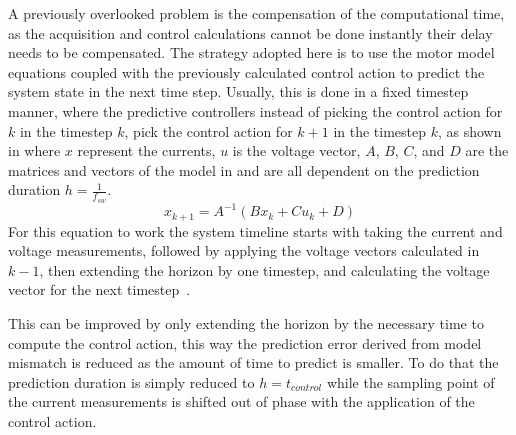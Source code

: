 \documentclass[9pt,conference]{IEEEtran}
\begin{document}
A previously overlooked problem is the compensation of the computational time, as the acquisition and control calculations cannot be done instantly their delay needs to be compensated. The strategy adopted here is to use the motor model equations  coupled with the previously calculated control action to predict the system state in the next time step. Usually, this is done in a fixed timestep manner, where the predictive controllers instead of picking the control action for $k$ in the timestep $k$, pick the control action for $k+1$ in the timestep $k$, as shown in  where $x$ represent the currents, $u$ is the voltage vector, $A$, $B$, $C$, and $D$ are the matrices and vectors of the model in  and are all dependent on the prediction duration $h = \frac{1}{f_{sw}}$.
\begin{equation}
	x_{k+1} = A^{-1} \left (B x_k + C u_k + D\right )
	\label{eq:horizon_default}
\end{equation}
For this equation to work the system timeline starts with taking the current and voltage measurements, followed by applying the voltage vectors calculated in $k-1$, then extending the horizon by one timestep, and calculating the voltage vector for the next timestep~\cite{Vazquez:MPC_uses:2014}.

This can be improved by only extending the horizon by the necessary time to compute the control action, this way the prediction error derived from model mismatch is reduced as the amount of time to predict is smaller. To do that the prediction duration is simply reduced to $h = t_{control}$ while the sampling point of the current measurements is shifted out of phase with the application of the control action. 
\end{document}
